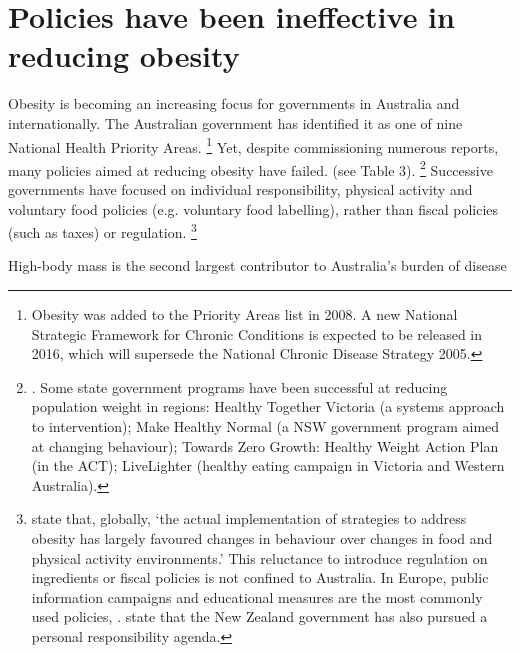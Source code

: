 \documentclass[embargoed]{grattan}
\begin{document}
\section{Policies have been ineffective in reducing obesity}\label{policies-have-been-ineffective-in-reducing-obesity}

Obesity is becoming an increasing focus for governments in Australia and internationally.
The Australian government has identified it as one of nine National Health Priority Areas.%
\footnote{Obesity was added to the Priority Areas list in 2008.
A new National Strategic Framework for Chronic Conditions is expected to be released in 2016, which will supersede the National Chronic Disease Strategy 2005.} Yet, despite commissioning numerous reports, many policies aimed at reducing obesity have failed. (see Table 3).%
\footnote{\textcite{Swinburn2013Progressobesityprevention}.
Some state government programs have been successful at reducing population weight in regions: Healthy Together Victoria (a systems approach to intervention); Make Healthy Normal (a NSW government program aimed at changing behaviour); Towards Zero Growth: Healthy Weight Action Plan (in the ACT); LiveLighter (healthy eating campaign in Victoria and Western Australia).} Successive governments have focused on individual responsibility, physical activity and voluntary food policies (e.g. voluntary food labelling), rather than fiscal policies (such as taxes) or regulation.%
\footnote{\textcite{Roberto2015Patchyprogressobesity} state that, globally, `the actual implementation of strategies to address obesity has largely favoured changes in behaviour over changes in food and physical activity environments.' This reluctance to introduce regulation on ingredients or fiscal policies is not confined to Australia.
In Europe, public information campaigns and educational measures are the most commonly used policies, \textcite{Capacci2012Policiespromotehealthy}. \textcite{Swinburn2013Progressobesityprevention} state that the New Zealand government has also pursued a personal responsibility agenda.}

\begin{table}
\caption{High-body mass is the second largest contributor to Australia's burden of disease}




\end{table}
\end{document}
